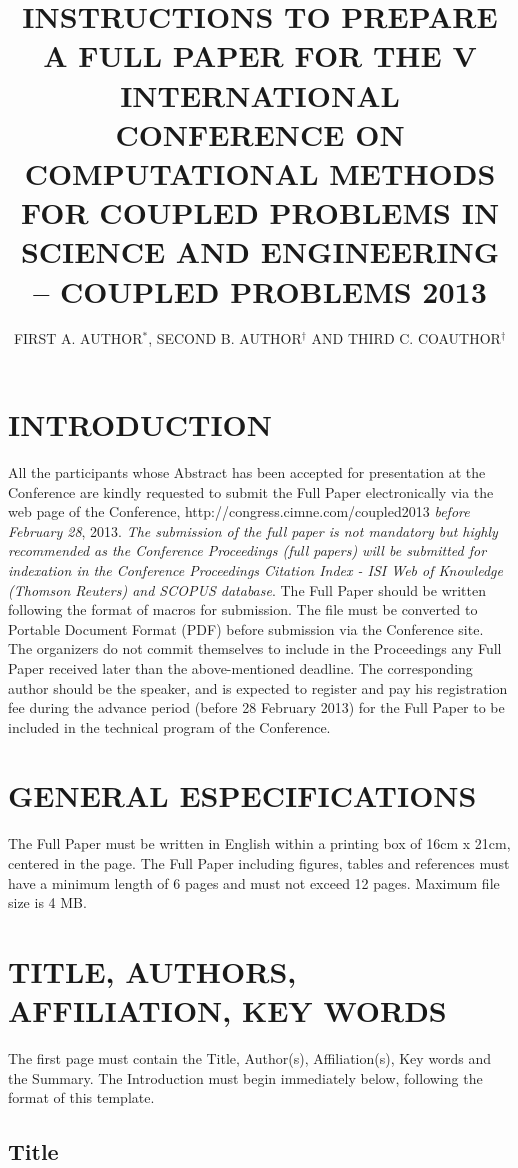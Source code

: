 \documentclass{coupled}
\title{INSTRUCTIONS TO PREPARE A FULL PAPER FOR THE V INTERNATIONAL CONFERENCE ON COMPUTATIONAL METHODS
FOR COUPLED PROBLEMS IN SCIENCE AND ENGINEERING -- COUPLED PROBLEMS 2013}
\author{FIRST A. AUTHOR$^{*}$, SECOND B. AUTHOR$^{\dag}$ AND THIRD C. COAUTHOR$^{\dag}$}
\begin{document}

\section{INTRODUCTION}

All the participants whose Abstract has been accepted for presentation at the Conference are kindly requested to submit the Full Paper electronically via the web page of the Conference, http://congress.cimne.com/coupled2013 \emph{before  February 28}, 2013. {\it The submission of the full paper is not mandatory but highly recommended as the Conference Proceedings (full papers) will be submitted for indexation in the Conference Proceedings Citation Index - ISI Web of Knowledge (Thomson Reuters) and SCOPUS database}. The Full Paper should be written following the format of macros for submission. The file must be converted to  Portable Document Format (PDF) before submission via the Conference site. The organizers do not commit themselves to include in the Proceedings any Full Paper received later than the above-mentioned deadline. The corresponding author should be the speaker, and is expected to register and pay his registration fee during the advance period (before 28 February 2013) for the Full Paper to be included in the technical program of the Conference.

\section{GENERAL ESPECIFICATIONS}

The Full Paper must be written in English within a printing box of 16cm x 21cm, centered in the page. The Full Paper including figures, tables and references must have a minimum length of 6 pages and must not exceed 12 pages. Maximum file size is 4 MB.

\section{TITLE, AUTHORS, AFFILIATION, KEY WORDS}

The first page must contain the Title, Author(s), Affiliation(s),
Key words and the Summary. The Introduction must begin immediately
below, following the format of this template.

\subsection{Title}
\end{document}
